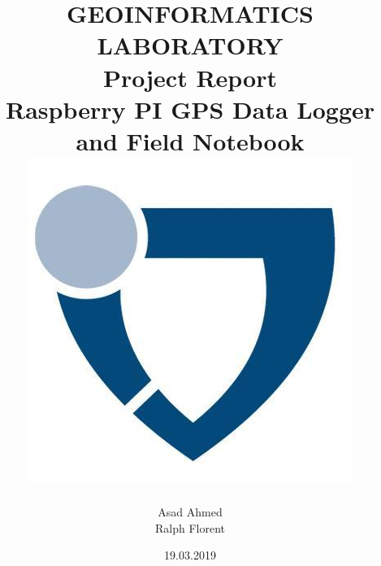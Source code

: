 \documentclass[12pt,a4paper]{article}
\title{
{GEOINFORMATICS LABORATORY}\\
{\large Project Report}\\
{\small Raspberry PI GPS Data Logger and Field Notebook}
\vspace{1.4cm}
{\includegraphics[scale=0.45]{jacobs_logo.jpeg}}}
\author{Asad Ahmed\\Ralph Florent}
\date{19.03.2019}
\begin{document}
\maketitle
\newpage

\tableofcontents
\newpage




\newpage


\newpage



\nocite{*}


\end{document}
